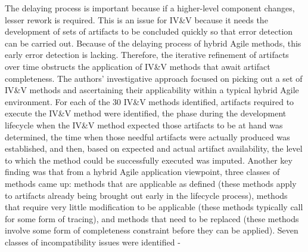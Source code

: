 \documentclass[journal, onecolumn]{IEEEtran}
\begin{document}
	\newline \newline
	The delaying process is important because if a higher-level component changes, lesser rework is required. This is an issue for IV\&V because it needs the development of sets of artifacts to be concluded quickly so that error detection can be carried out. Because of the delaying process of hybrid Agile methods, this early error detection is lacking. Therefore, the iterative refinement of artifacts over time obstructs the application of IV\&V methods that await artifact completeness.
	\newline \newline
	The authors' investigative approach focused on picking out a set of IV\&V methods and ascertaining their applicability within a typical hybrid Agile environment.
	\newline \newline
	For each of the 30 IV\&V methods identified, artifacts required to execute the IV\&V method were identified, the phase during the development lifecycle when the IV\&V method expected those artifacts to be at hand was determined, the time when those needful artifacts were actually produced was established, and then, based on expected and actual artifact availability, the level to which the method could be successfully executed was imputed.
	\newline \newline
	Another key finding was that from a hybrid Agile application viewpoint, three classes of methods came up: methods that are applicable as defined (these methods apply to artifacts already being brought out early in the lifecycle process), methods that require very little modification to be applicable (these methods typically call for some form of tracing), and methods that need to be replaced (these methods involve some form of completeness constraint before they can be applied).
	\newline \newline
	Seven classes of incompatibility issues were identified -
\end{document}
